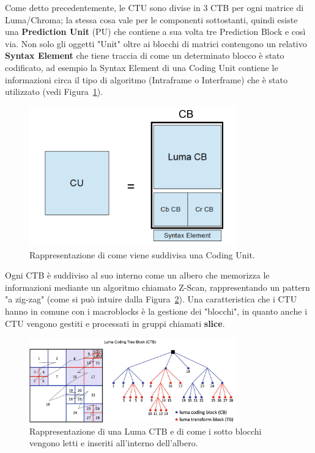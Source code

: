 \documentclass[a4paper,12pt, oneside]{article}
\begin{document}
Come detto precedentemente, le CTU sono divise in 3 CTB per ogni matrice di Luma/Chroma; la stessa
cosa vale per le componenti sottostanti, quindi esiste una \textbf{Prediction Unit} (PU) che contiene
a sua volta tre Prediction Block e così via. Non solo gli oggetti "Unit" oltre ai blocchi di matrici
contengono un relativo \textbf{Syntax Element} che tiene traccia di come un determinato blocco è
stato codificato, ad esempio la Syntax Element di una Coding Unit contiene le informazioni circa
 il tipo di algoritmo (Intraframe o Interframe) che è stato utilizzato (vedi Figura~\ref{fig:coding_unit}).
 
 \begin{figure}[h]
    \centering
    \includegraphics[width=0.8\textwidth]{images/coding-unit.png}
    \caption{Rappresentazione di come viene suddivisa una Coding Unit.}
    \label{fig:coding_unit}
\end{figure}

 \noindent Ogni CTB è suddiviso al suo interno come un albero che memorizza le informazioni mediante un algoritmo
chiamato Z-Scan, rappresentando un pattern "a zig-zag" (come si può intuire dalla
Figura~\ref{fig:chroma_CTB}).
Una caratteristica che i CTU hanno in comune con i macroblocks è la gestione dei "blocchi",
in quanto anche i CTU vengono gestiti e processati in gruppi chiamati \textbf{slice}.

\begin{figure}[h]
    \centering
    \includegraphics[width=0.8\textwidth]{images/chroma-CTB.png}
    \caption{Rappresentazione di una Luma CTB e di come i sotto blocchi vengono letti e inseriti
    all'interno dell'albero.}
    \label{fig:chroma_CTB}
\end{figure}
\end{document}

